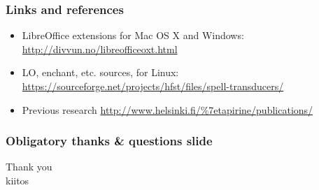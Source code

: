 \documentclass[t,12pt]{beamer}
\begin{document}
\begin{frame}[label=links]
    \frametitle{Links and references}
    \begin{itemize}
        \item LibreOffice extensions for Mac OS X and Windows:
            \url{http://divvun.no/libreofficeoxt.html}
        \item LO, enchant, etc. sources, for Linux:
            \url{https://sourceforge.net/projects/hfst/files/spell-transducers/}
        \item Previous research \url{http://www.helsinki.fi/\%7etapirine/publications/}
    \end{itemize}
\end{frame}

\begin{frame}
    \frametitle{Obligatory thanks \& questions slide}
    Thank you\\ kiitos\\
\end{frame}
\end{document}
